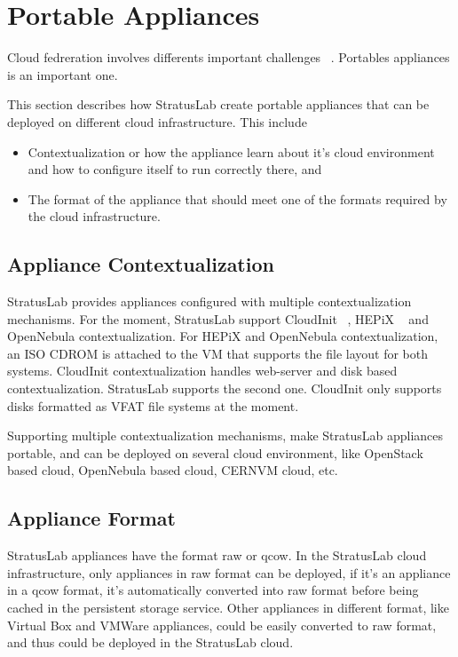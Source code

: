 \section{Portable Appliances}
Cloud fedreration involves differents important challenges ~\cite{Petcu}. Portables appliances is an important one.

This section describes how StratusLab create portable appliances that can be deployed on different cloud infrastructure. This include 
\begin{itemize}
\item Contextualization or how the appliance learn about it's cloud environment and how to configure itself to run correctly there, and 
\item  The format of the appliance that should meet one of the formats required by the cloud infrastructure.
\end{itemize}
\subsection{Appliance Contextualization}
StratusLab provides appliances configured with multiple contextualization mechanisms. For the moment, StratusLab support CloudInit ~\cite{cloudinit}, HEPiX  ~\cite{hepixbookcontext} and OpenNebula contextualization.
For HEPiX and OpenNebula contextualization, an ISO CDROM is attached to the VM that supports the file layout for both systems.
CloudInit contextualization handles web-server and disk based contextualization. StratusLab supports the second one. CloudInit only supports disks formatted as VFAT file systems at the moment.

Supporting multiple contextualization mechanisms, make StratusLab appliances portable, and can be deployed on several cloud environment, like OpenStack based cloud, OpenNebula based cloud, CERNVM cloud, etc.

\subsection{Appliance Format}
StratusLab appliances have the format raw or qcow. In the StratusLab cloud infrastructure, only appliances in raw format can be deployed, if it's an appliance in a qcow format, it's automatically converted into raw format before being cached in the persistent storage service. Other appliances in different format, like Virtual Box and VMWare appliances, could be easily converted to raw format, and thus could be deployed in the StratusLab cloud.

